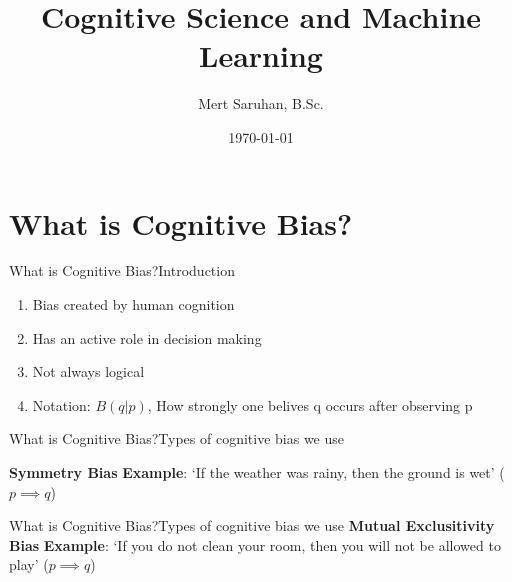 \documentclass[
	aspectratio=169,	%
	onlytextwidth,		%
	t,					%
	]{beamer}
\title[Cognitive Science and Machine Learning]{Cognitive Science and Machine Learning}
\subtitle{}
\author[Mert Saruhan]{Mert Saruhan, B.Sc.}
\date{\today} %
\begin{document}
	\section{What is Cognitive Bias?}
	
	\begin{frame}[fragile]{What is Cognitive Bias?}{Introduction}
		
		
		\begin{enumerate} 
			\item<1-> Bias created by human cognition
			\item<2-> Has an active role in decision making 
			\item<3-> Not always logical
			\item<4-> Notation: $ B(q|p) $,\newline
			How strongly one belives q occurs after observing p
		\end{enumerate}
	
	\end{frame}

	\begin{frame}[fragile]{What is Cognitive Bias?}{Types of cognitive bias we use}
			
			\textbf{Symmetry Bias} \newline
			\textbf{Example}: `If the weather was rainy, then the ground is wet' \newline
			($p \implies q$)\newline
			\newline
			\uncover<2->{($q \implies p$)}
	
	\end{frame}
	
	\begin{frame}[fragile]{What is Cognitive Bias?}{Types of cognitive bias we use}
			\textbf{Mutual Exclusitivity Bias} \newline
			\textbf{Example}: `If you do not clean your room, then you will not be allowed to play' \newline
			($ p \implies q$)\newline
			\newline
			\uncover<2->{($\neg p \implies \neg q$)}
	
	\end{frame}
		
\end{document}
